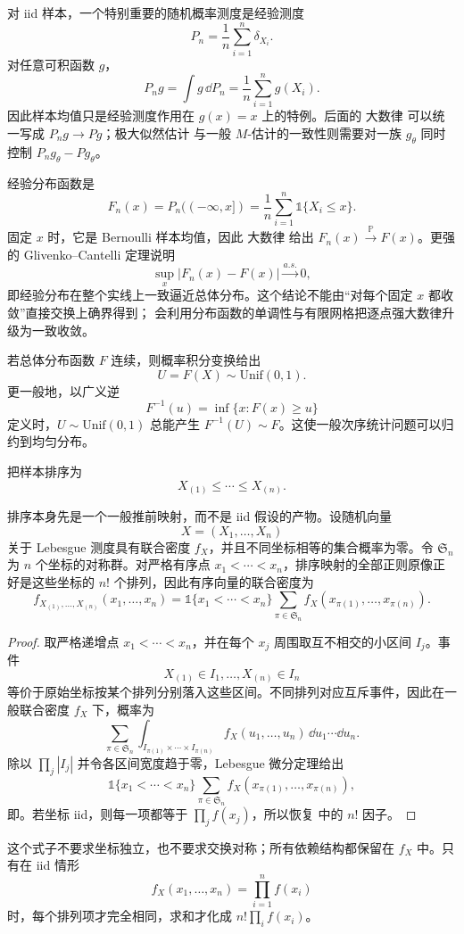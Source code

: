 对 iid 样本，一个特别重要的随机概率测度是经验测度
\[
 P_n=\frac1n\sum_{i=1}^n\delta_{X_i}.
\]
对任意可积函数 $g$，
\[
 P_ng=\int g\,\dd P_n
 =\frac1n\sum_{i=1}^ng(X_i).
\]
因此样本均值只是经验测度作用在 $g(x)=x$ 上的特例。后面的 大数律 可以统一写成 $P_ng\to Pg$；极大似然估计 与一般 $M$-估计的一致性则需要对一族 $g_\theta$ 同时控制 $P_ng_\theta-Pg_\theta$。

经验分布函数是
\[
 F_n(x)=P_n(( -\infty,x])
 =\frac1n\sum_{i=1}^n\mathds{1}\{X_i\le x\}.
\]
固定 $x$ 时，它是 Bernoulli 样本均值，因此 大数律 给出 $F_n(x)\xrightarrow{\mathbb P} F(x)$。更强的 Glivenko--Cantelli 定理说明
\begin{equation}\label{eq:math-stat-glivenko-cantelli}
 \sup_x|F_n(x)-F(x)|\xrightarrow{a.s.}0,
\end{equation}
即经验分布在整个实线上一致逼近总体分布。这个结论不能由“对每个固定 $x$ 都收敛”直接交换上确界得到； 会利用分布函数的单调性与有限网格把逐点强大数律升级为一致收敛。

若总体分布函数 $F$ 连续，则概率积分变换给出
\[
 U=F(X)\sim\mathrm{Unif}(0,1).
\]
更一般地，以广义逆
\[
 F^{-1}(u)=\inf\{x:F(x)\ge u\}
\]
定义时，$U\sim\mathrm{Unif}(0,1)$ 总能产生 $F^{-1}(U)\sim F$。这使一般次序统计问题可以归约到均匀分布。

把样本排序为
\[
 X_{(1)}\le\cdots\le X_{(n)}.
\]
\begin{proposition}[一般联合密度的排序推前]
排序本身先是一个一般推前映射，而不是 iid 假设的产物。设随机向量
\[
 X=(X_1,\ldots,X_n)
\]
关于 Lebesgue 测度具有联合密度 $f_X$，并且不同坐标相等的集合概率为零。令 $\mathfrak S_n$ 为 $n$ 个坐标的对称群。对严格有序点 $x_1<\cdots<x_n$，排序映射的全部正则原像正好是这些坐标的 $n!$ 个排列，因此有序向量的联合密度为
\begin{equation}\label{eq:math-stat-general-ordered-density}
 f_{X_{(1)},\ldots,X_{(n)}}(x_1,\ldots,x_n)
 =\mathds{1}\{x_1<\cdots<x_n\}
 \sum_{\pi\in\mathfrak S_n}
 f_X(x_{\pi(1)},\ldots,x_{\pi(n)}).
\end{equation}
\end{proposition}
\begin{proof}
取严格递增点 $x_1<\cdots<x_n$，并在每个 $x_j$ 周围取互不相交的小区间 $I_j$。事件
\[
 X_{(1)}\in I_1,\ldots,X_{(n)}\in I_n
\]
等价于原始坐标按某个排列分别落入这些区间。不同排列对应互斥事件，因此在一般联合密度 $f_X$ 下，概率为
\[
 \sum_{\pi\in\mathfrak S_n}
 \int_{I_{\pi(1)}\times\cdots\times I_{\pi(n)}}
 f_X(u_1,\ldots,u_n)\,
 \dd u_1\cdots\dd u_n.
\]
除以 $\prod_j|I_j|$ 并令各区间宽度趋于零，Lebesgue 微分定理给出
\[
 \mathds{1}\{x_1<\cdots<x_n\}
 \sum_{\pi\in\mathfrak S_n}
 f_X(x_{\pi(1)},\ldots,x_{\pi(n)}),
\]
即。若坐标 iid，则每一项都等于 $\prod_jf(x_j)$，所以恢复
中的 $n!$ 因子。
\end{proof}
这个式子不要求坐标独立，也不要求交换对称；所有依赖结构都保留在 $f_X$ 中。只有在 iid 情形
\[
 f_X(x_1,\ldots,x_n)=\prod_{i=1}^nf(x_i)
\]
时，每个排列项才完全相同，求和才化成 $n!\prod_i f(x_i)$。

